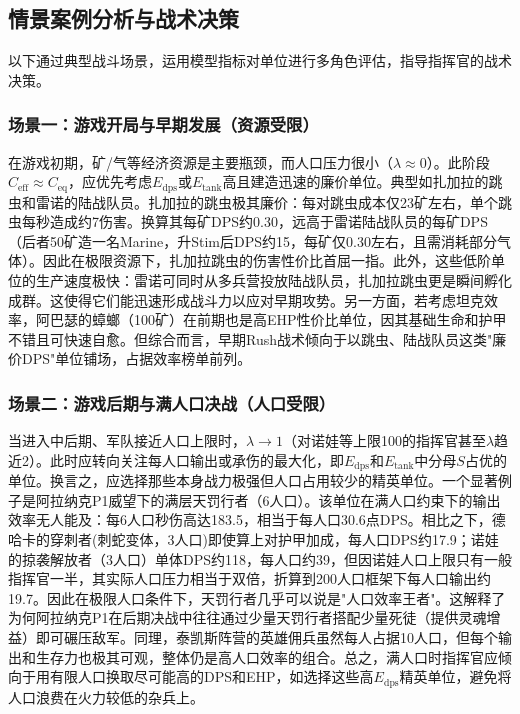 \documentclass[a4paper,12pt]{article}
\begin{document}
\begin{CJK}{UTF8}{gbsn}
\subsection{情景案例分析与战术决策}
以下通过典型战斗场景，运用模型指标对单位进行多角色评估，指导指挥官的战术决策。

\subsubsection{场景一：游戏开局与早期发展（资源受限）}
在游戏初期，矿/气等经济资源是主要瓶颈，而人口压力很小（$\lambda \approx 0$）。此阶段$C_{\text{eff}}\approx C_{\text{eq}}$，应优先考虑$E_{\text{dps}}$或$E_{\text{tank}}$高且建造迅速的廉价单位。典型如扎加拉的跳虫和雷诺的陆战队员。扎加拉的跳虫极其廉价：每对跳虫成本仅23矿左右，单个跳虫每秒造成约7伤害。换算其每矿DPS约0.30，远高于雷诺陆战队员的每矿DPS（后者50矿造一名Marine，升Stim后DPS约15，每矿仅0.30左右，且需消耗部分气体）。因此在极限资源下，扎加拉跳虫的伤害性价比首屈一指。此外，这些低阶单位的生产速度极快：雷诺可同时从多兵营投放陆战队员，扎加拉跳虫更是瞬间孵化成群。这使得它们能迅速形成战斗力以应对早期攻势。另一方面，若考虑坦克效率，阿巴瑟的蟑螂（100矿）在前期也是高EHP性价比单位，因其基础生命和护甲不错且可快速自愈。但综合而言，早期Rush战术倾向于以跳虫、陆战队员这类"廉价DPS"单位铺场，占据效率榜单前列。

\subsubsection{场景二：游戏后期与满人口决战（人口受限）}
当进入中后期、军队接近人口上限时，$\lambda \to 1$（对诺娃等上限100的指挥官甚至$\lambda$趋近2）。此时应转向关注每人口输出或承伤的最大化，即$E_{\text{dps}}$和$E_{\text{tank}}$中分母$S$占优的单位。换言之，应选择那些本身战力极强但人口占用较少的精英单位。一个显著例子是阿拉纳克P1威望下的满层天罚行者（6人口）。该单位在满人口约束下的输出效率无人能及：每6人口秒伤高达183.5，相当于每人口30.6点DPS。相比之下，德哈卡的穿刺者(刺蛇变体，3人口)即使算上对护甲加成，每人口DPS约17.9；诺娃的掠袭解放者（3人口）单体DPS约118，每人口约39，但因诺娃人口上限只有一般指挥官一半，其实际人口压力相当于双倍，折算到200人口框架下每人口输出约19.7。因此在极限人口条件下，天罚行者几乎可以说是"人口效率王者"。这解释了为何阿拉纳克P1在后期决战中往往通过少量天罚行者搭配少量死徒（提供灵魂增益）即可碾压敌军。同理，泰凯斯阵营的英雄佣兵虽然每人占据10人口，但每个输出和生存力也极其可观，整体仍是高人口效率的组合。总之，满人口时指挥官应倾向于用有限人口换取尽可能高的DPS和EHP，如选择这些高$E_{\text{dps}}$精英单位，避免将人口浪费在火力较低的杂兵上。


\end{CJK}
\end{document}
